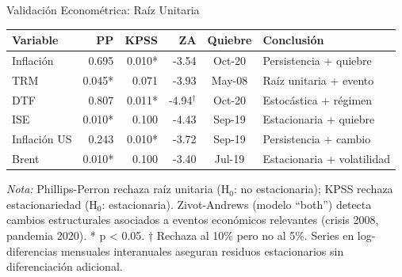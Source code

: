 \documentclass{beamer}
\begin{document}
\begin{frame}[fragile]{Validación Econométrica: Raíz Unitaria}
\scriptsize
\vspace{-0.3cm}
\begin{center}
\begin{tabular}{lrrrcp{2.5cm}}
\toprule
\textbf{Variable} & \textbf{PP} & \textbf{KPSS} & \textbf{ZA} & \textbf{Quiebre} & \textbf{Conclusión} \\
\midrule
Inflación & 0.695 & 0.010* & -3.54 & Oct-20 & Persistencia + quiebre \\
TRM & 0.045* & 0.071 & -3.93 & May-08 & Raíz unitaria + evento \\
DTF & 0.807 & 0.011* & -4.94$^\dagger$ & Oct-20 & Estocástica + régimen \\
ISE & 0.010* & 0.100 & -4.43 & Sep-19 & Estacionaria + quiebre \\
Inflación US & 0.243 & 0.010* & -3.72 & Sep-19 & Persistencia + cambio \\
Brent & 0.010* & 0.100 & -3.40 & Jul-19 & Estacionaria + volatilidad \\
\bottomrule
\end{tabular}
\end{center}

\vspace{0.2cm}
\tiny
\textit{Nota:} Phillips-Perron rechaza raíz unitaria (H$_0$: no estacionaria); KPSS rechaza estacionariedad (H$_0$: estacionaria). Zivot-Andrews (modelo ``both'') detecta cambios estructurales asociados a eventos económicos relevantes (crisis 2008, pandemia 2020). * p < 0.05. $\dagger$ Rechaza al 10\% pero no al 5\%. Series en log-diferencias mensuales interanuales aseguran residuos estacionarios sin diferenciación adicional.
\end{frame}
\end{document}
